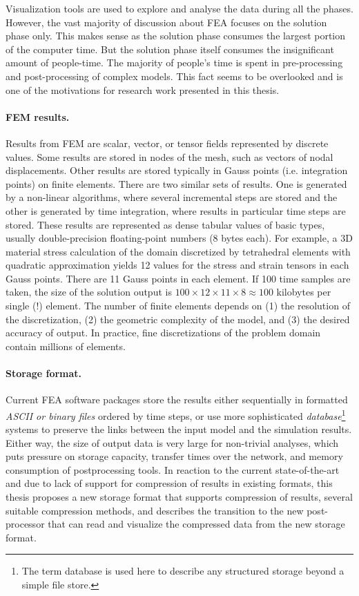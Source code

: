 Visualization tools are used to explore and analyse the data during all the phases. However, the vast majority of discussion about FEA focuses on the solution phase only. This makes sense as the solution phase consumes the largest portion of the computer time. But the solution phase itself consumes the insignificant amount of people-time. The majority of people's time is spent in pre-processing and post-processing of complex models. This fact seems to be overlooked and is one of the motivations for research work presented in this thesis.

\paragraph{FEM results.} Results from FEM are scalar, vector, or tensor fields represented by discrete values. Some results are stored in nodes of the mesh, such as vectors of nodal displacements. Other results are stored typically in Gauss points (i.e. integration points) on finite elements. There are two similar sets of results. One is generated by a non-linear algorithms, where several incremental steps are stored and the other is generated by time integration, where results in particular time steps are stored. These results are represented as dense tabular values of basic types, usually double-precision floating-point numbers (8 bytes each). For example, a 3D material stress calculation of the domain discretized by tetrahedral elements with quadratic approximation yields 12 values for the stress and strain tensors in each Gauss points. There are 11 Gauss points in each element. If 100 time samples are taken, the size of the solution output is $100 \times 12 \times 11 \times 8 \approx 100$ kilobytes per single (!) element. The number of finite elements depends on (1) the resolution of the discretization, (2) the geometric complexity of the model, and (3) the desired accuracy of output. In practice, fine discretizations of the problem domain contain millions of elements.

\paragraph{Storage format.} Current FEA software packages store the results either sequentially in formatted \textit{ASCII or binary files} ordered by time steps, or use more sophisticated \textit{database}\footnote{The term database is used here to describe any structured storage beyond a simple file store.} systems to preserve the links between the input model and the simulation results. Either way, the size of output data is very large for non-trivial analyses, which puts pressure on storage capacity, transfer times over the network, and memory consumption of postprocessing tools. In reaction to the current state-of-the-art and due to lack of support for compression of results in existing formats, this thesis proposes a new storage format that supports compression of results, several suitable compression methods, and describes the transition to the new post-processor that can read and visualize the compressed data from the new storage format.

